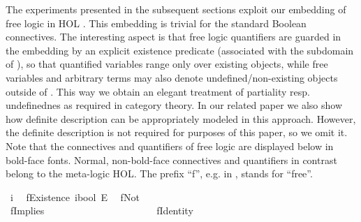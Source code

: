 \begin{isabellebody}
\begin{isamarkuptext}
The experiments presented in the subsequent sections exploit our embedding of free logic 
in HOL \cite{C57}. This embedding is trivial for the standard Boolean connectives. The interesting
aspect is that free logic quantifiers are guarded in the embedding by an explicit existence 
predicate  (associated with the subdomain  of ), so 
that quantified variables range only over existing objects, while free 
variables and arbitrary terms may also denote undefined/non-existing objects outside of . 
This way we obtain an 
elegant treatment of partiality resp. undefinednes as required in category theory. In our related 
paper \cite{C57} we also show how definite description can be appropriately modeled in this
approach. However, the definite description is not required for purposes of this paper, so we omit it.
Note that the connectives and quantifiers of free logic are displayed below in bold-face fonts. Normal, 
non-bold-face connectives and quantifiers in contrast belong to the meta-logic HOL. The prefix ``f'',
e.g. in , stands for ``free''.%
\end{isamarkuptext}\isamarkuptrue%
\isamarkupfalse%
\ i\ %
\isanewline
{}\isamarkupfalse%
\ fExistence{\isacharcolon}{\isacharcolon}\ {\isachardoublequoteopen}i{\isasymRightarrow}bool{\isachardoublequoteclose}\ {\isacharparenleft}{\isachardoublequoteopen}E{\isachardoublequoteclose}{\isacharparenright}\ %
\isanewline
\isanewline
{}\isamarkupfalse%
\ fNot\ {\isacharparenleft}{\isachardoublequoteopen}\isactrlbold {\isasymnot}{\isachardoublequoteclose}{\isacharparenright}\ %
\ \ \ \ \ \ \ \ \ \ \ \ \ \ \ \ \ \ \ \ \ \ \ \ \ \ \isanewline
\ \ {\isachardoublequoteopen}\isactrlbold {\isasymnot}{\isasymphi}\ {\isasymequiv}\ {\isasymnot}{\isasymphi}{\isachardoublequoteclose}\ \ \ \ \ \isanewline
{}\isamarkupfalse%
\ fImplies\ {\isacharparenleft}\ {\isachardoublequoteopen}\isactrlbold {\isasymrightarrow}{\isachardoublequoteclose}\ {}{}{\isacharparenright}\ %
\ \ \ \ \ \ \ \ \isanewline
\ \ {\isachardoublequoteopen}{\isasymphi}\ \isactrlbold {\isasymrightarrow}\ {\isasympsi}\ {\isasymequiv}\ {\isasymphi}\ {\isasymlongrightarrow}\ {\isasympsi}{\isachardoublequoteclose}\isanewline
{}\isamarkupfalse%
\ fIdentity\ {\isacharparenleft}\ {\isachardoublequoteopen}\isactrlbold {\isacharequal}{\isachardoublequoteclose}\ {}{}{\isacharparenright}\ %

\end{isabellebody}

